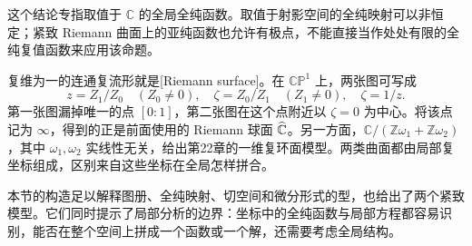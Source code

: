 这个结论专指取值于 \(\mathbb C\) 的全局全纯函数。取值于射影空间的全纯映射可以非恒定；紧致 Riemann 曲面上的亚纯函数也允许有极点，不能直接当作处处有限的全纯复值函数来应用该命题。

\ProseParagraphBreak

复维为一的连通复流形就是[Riemann surface]。在 \(\mathbb{CP}^1\) 上，两张图可写成
\[
 z=Z_1/Z_0\quad(Z_0\ne0),
 \quad \zeta=Z_0/Z_1\quad(Z_1\ne0),
 \quad \zeta=1/z.
\]
第一张图漏掉唯一的点 \([0:1]\)，第二张图在这个点附近以 \(\zeta=0\) 为中心。将该点记为 \(\infty\)，得到的正是前面使用的 Riemann 球面 \(\widehat{\mathbb C\kern0pt}\)。另一方面，\(\mathbb C/(\mathbb Z\omega_1+\mathbb Z\omega_2)\)，其中 \(\omega_1,\omega_2\) 实线性无关，给出第22章的一维复环面模型。两类曲面都由局部复坐标组成，区别来自这些坐标在全局怎样拼合。

\ProseParagraphBreak

本节的构造足以解释图册、全纯映射、切空间和微分形式的型，也给出了两个紧致模型。它们同时提示了局部分析的边界：坐标中的全纯函数与局部方程都容易识别，能否在整个空间上拼成一个函数或一个解，还需要考虑全局结构。
